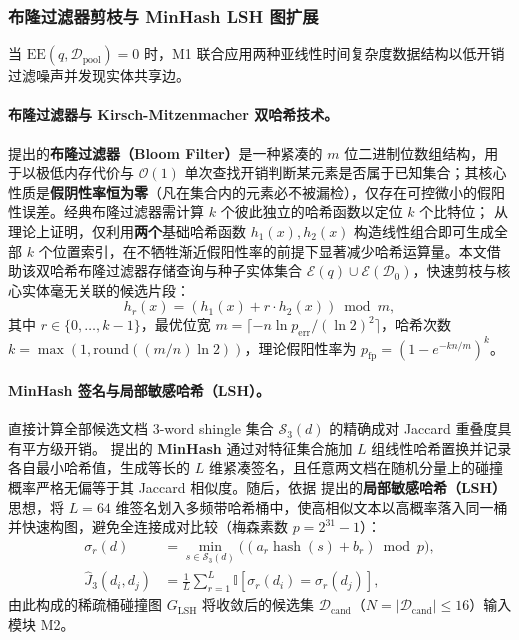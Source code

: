 \documentclass[11pt]{article}
\begin{document}
\subsubsection{布隆过滤器剪枝与 MinHash LSH 图扩展}
当 $\text{EE}(q, \mathcal{D}_{\text{pool}}) = 0$ 时，M1 联合应用两种亚线性时间复杂度数据结构以低开销过滤噪声并发现实体共享边。

\paragraph{布隆过滤器与 Kirsch-Mitzenmacher 双哈希技术。}
\citet{bloom1970space} 提出的\textbf{布隆过滤器（Bloom Filter）}是一种紧凑的 $m$ 位二进制位数组结构，用于以极低内存代价与 $\mathcal{O}(1)$ 单次查找开销判断某元素是否属于已知集合；其核心性质是\textbf{假阴性率恒为零}（凡在集合内的元素必不被漏检），仅存在可控微小的假阳性误差。经典布隆过滤器需计算 $k$ 个彼此独立的哈希函数以定位 $k$ 个比特位；\citet{kirsch2006less} 从理论上证明，仅利用\textbf{两个}基础哈希函数 $h_1(x), h_2(x)$ 构造线性组合即可生成全部 $k$ 个位置索引，在不牺牲渐近假阳性率的前提下显著减少哈希运算量。本文借助该双哈希布隆过滤器存储查询与种子实体集合 $\mathcal{E}(q) \cup \mathcal{E}(\mathcal{D}_0)$，快速剪枝与核心实体毫无关联的候选片段：
\begin{equation}
h_r(x) = \left( h_1(x) + r \cdot h_2(x) \right) \bmod m,
\label{eq:zh_m1_bloom}
\end{equation}
其中 $r \in \{0, \dots, k-1\}$，最优位宽 $m = \lceil -n \ln p_{\text{err}} / (\ln 2)^2 \rceil$，哈希次数 $k = \max(1, \text{round}((m/n)\ln 2))$，理论假阳性率为 $p_{\text{fp}} = (1 - e^{-kn/m})^k$。

\paragraph{MinHash 签名与局部敏感哈希（LSH）。}
直接计算全部候选文档 3-word shingle 集合 $\mathcal{S}_3(d)$ 的精确成对 Jaccard 重叠度具有平方级开销。\citet{broder1997resemblance} 提出的 \textbf{MinHash} 通过对特征集合施加 $L$ 组线性哈希置换并记录各自最小哈希值，生成等长的 $L$ 维紧凑签名，且任意两文档在随机分量上的碰撞概率严格无偏等于其 Jaccard 相似度。随后，依据 \citet{indyk1998lsh} 提出的\textbf{局部敏感哈希（LSH）}思想，将 $L=64$ 维签名划入多频带哈希桶中，使高相似文本以高概率落入同一桶并快速构图，避免全连接成对比较（梅森素数 $p = 2^{31}-1$）：
\begin{align}
\sigma_r(d) &= \min_{s \in \mathcal{S}_3(d)} \bigl( (a_r \operatorname{hash}(s) + b_r) \bmod p \bigr), \label{eq:zh_m1_minhash} \\
\hat{J}_3(d_i, d_j) &= \frac{1}{L}\sum_{r=1}^L \mathbb{I}\left[\sigma_r(d_i) = \sigma_r(d_j)\right],
\label{eq:zh_m1_j3}
\end{align}
由此构成的稀疏桶碰撞图 $G_{\text{LSH}}$ 将收敛后的候选集 $\mathcal{D}_{\text{cand}}$（$N = |\mathcal{D}_{\text{cand}}| \le 16$）输入模块 M2。
\end{document}

